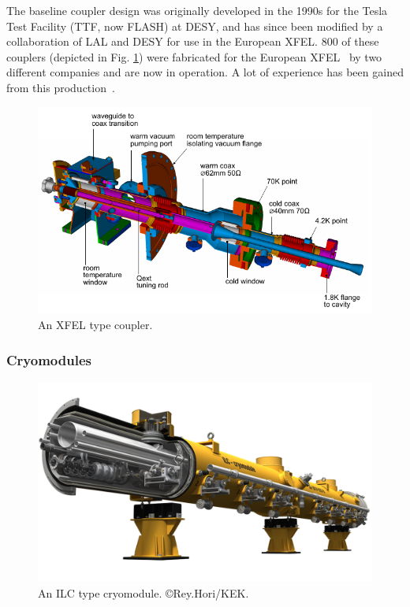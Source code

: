 The baseline coupler design was originally developed in the 1990s for the Tesla Test Facility (TTF, now FLASH) at DESY,
and has since been modified by a collaboration of LAL and DESY for use in the European XFEL.
$800$ of these couplers (depicted in Fig. \ref{fig:xfelcoupler}) were fabricated for the European XFEL~\cite{Kaabi:2013wna} by two different companies and are now in operation.
A lot of experience has been gained from this production~\cite{Sierra:2017wyc}.



\begin{figure}[htbp]
   \includegraphics[width=\hsize]{chapters/figures/xfelcoupler}
\caption{An XFEL type coupler.
}
\label{fig:xfelcoupler}
\end{figure}


\subsubsection{Cryomodules}

\begin{figure}[htbp]
   \includegraphics[width=\hsize]{chapters/figures/10_ILC_cryomodule}
\caption{An ILC type cryomodule. \copyright Rey.Hori/KEK.}
\label{fig:crymodule}
\end{figure}


